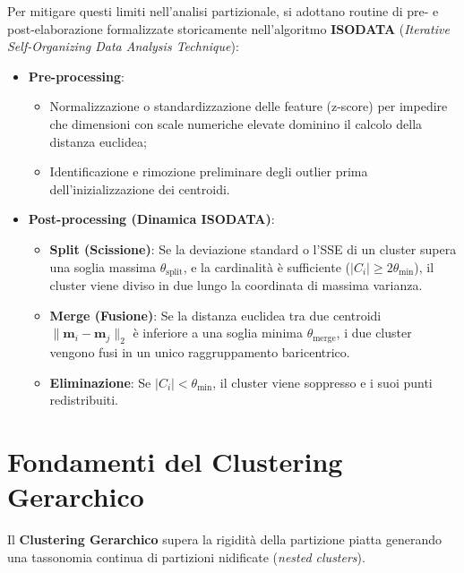 Per mitigare questi limiti nell'analisi partizionale, si adottano routine di pre- e post-elaborazione formalizzate storicamente nell'algoritmo \textbf{ISODATA} (\textit{Iterative Self-Organizing Data Analysis Technique}):
\begin{itemize}
    \item \textbf{Pre-processing}:
    \begin{itemize}[noitemsep]
        \item Normalizzazione o standardizzazione delle feature (z-score) per impedire che dimensioni con scale numeriche elevate dominino il calcolo della distanza euclidea;
        \item Identificazione e rimozione preliminare degli outlier prima dell'inizializzazione dei centroidi.
    \end{itemize}
    \item \textbf{Post-processing (Dinamica ISODATA)}:
    \begin{itemize}[noitemsep]
        \item \textbf{Split (Scissione)}: Se la deviazione standard o l'SSE di un cluster supera una soglia massima $\theta_{\text{split}}$, e la cardinalità è sufficiente ($|C_i| \ge 2\theta_{\min}$), il cluster viene diviso in due lungo la coordinata di massima varianza.
        \item \textbf{Merge (Fusione)}: Se la distanza euclidea tra due centroidi $\|\mathbf{m}_i - \mathbf{m}_j\|_2$ è inferiore a una soglia minima $\theta_{\text{merge}}$, i due cluster vengono fusi in un unico raggruppamento baricentrico.
        \item \textbf{Eliminazione}: Se $|C_i| < \theta_{\min}$, il cluster viene soppresso e i suoi punti redistribuiti.
    \end{itemize}
\end{itemize}

\FloatBarrier
\section{Fondamenti del Clustering Gerarchico}
\label{sec:dm-hierarchical-foundations-dendrogram}

Il \textbf{Clustering Gerarchico} supera la rigidità della partizione piatta generando una tassonomia continua di partizioni nidificate (\textit{nested clusters}).

